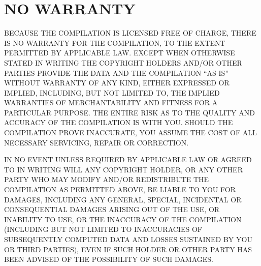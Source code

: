 \section*{NO WARRANTY}

  BECAUSE THE COMPILATION IS LICENSED FREE OF CHARGE, THERE IS NO
  WARRANTY FOR THE COMPILATION, TO THE EXTENT PERMITTED BY APPLICABLE
  LAW.  EXCEPT WHEN OTHERWISE STATED IN WRITING THE COPYRIGHT HOLDERS
  AND/OR OTHER PARTIES PROVIDE THE DATA AND THE COMPILATION ``AS IS''
  WITHOUT WARRANTY OF ANY KIND, EITHER EXPRESSED OR IMPLIED,
  INCLUDING, BUT NOT LIMITED TO, THE IMPLIED WARRANTIES OF
  MERCHANTABILITY AND FITNESS FOR A PARTICULAR PURPOSE.  THE ENTIRE
  RISK AS TO THE QUALITY AND ACCURACY OF THE COMPILATION IS WITH YOU.
  SHOULD THE COMPILATION PROVE INACCURATE, YOU ASSUME THE COST OF ALL
  NECESSARY SERVICING, REPAIR OR CORRECTION.

  IN NO EVENT UNLESS REQUIRED BY APPLICABLE LAW OR AGREED TO IN
  WRITING WILL ANY COPYRIGHT HOLDER, OR ANY OTHER PARTY WHO MAY MODIFY
  AND/OR REDISTRIBUTE THE COMPILATION AS PERMITTED ABOVE, BE LIABLE TO
  YOU FOR DAMAGES, INCLUDING ANY GENERAL, SPECIAL, INCIDENTAL OR
  CONSEQUENTIAL DAMAGES ARISING OUT OF THE USE, OR INABILITY TO USE,
  OR THE INACCURACY OF THE COMPILATION (INCLUDING BUT NOT LIMITED TO
  INACCURACIES OF SUBSEQUENTLY COMPUTED DATA AND LOSSES SUSTAINED BY
  YOU OR THIRD PARTIES), EVEN IF SUCH HOLDER OR OTHER PARTY HAS BEEN
  ADVISED OF THE POSSIBILITY OF SUCH DAMAGES.

